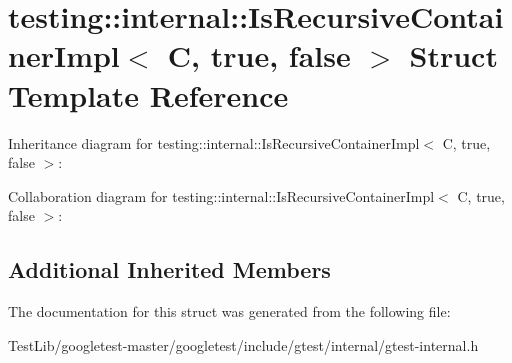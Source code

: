 \hypertarget{structtesting_1_1internal_1_1IsRecursiveContainerImpl_3_01C_00_01true_00_01false_01_4}{}\section{testing\+:\+:internal\+:\+:Is\+Recursive\+Container\+Impl$<$ C, true, false $>$ Struct Template Reference}
\label{structtesting_1_1internal_1_1IsRecursiveContainerImpl_3_01C_00_01true_00_01false_01_4}


Inheritance diagram for testing\+:\+:internal\+:\+:Is\+Recursive\+Container\+Impl$<$ C, true, false $>$\+:


Collaboration diagram for testing\+:\+:internal\+:\+:Is\+Recursive\+Container\+Impl$<$ C, true, false $>$\+:
\subsection*{Additional Inherited Members}


The documentation for this struct was generated from the following file\+:\begin{DoxyCompactItemize}
\item 
Test\+Lib/googletest-\/master/googletest/include/gtest/internal/gtest-\/internal.\+h\end{DoxyCompactItemize}
